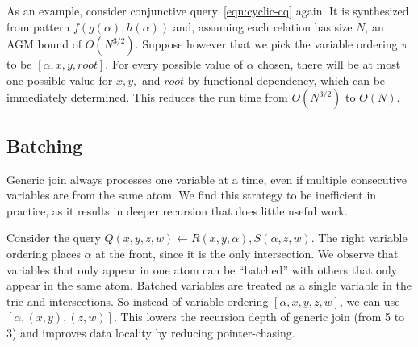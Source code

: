As an example, consider conjunctive query~\ref{eqn:cyclic-cq} again. It is
synthesized from pattern $f(g(\alpha), h(\alpha))$ and, assuming each relation
has size $N$, an AGM bound of $O(N^{3/2})$. Suppose however that we pick the
variable ordering $\pi$ to be $[\alpha, x, y, \textit{root}]$. For every
possible value of $\alpha$ chosen, there will be at most one possible value for
$x,y,$ and $\textit{root}$ by functional dependency, which can be immediately
determined. This reduces the run time from $O(N^{3/2})$ to $O(N)$.

\subsection{Batching}
Generic join always processes one variable at a time,
 even if multiple consecutive variables are from the same atom.
We find this strategy to be inefficient in practice,
 as it results in deeper recursion that does little useful work.

Consider the query $Q(x, y, z, w) \gets R(x, y, \alpha), S(\alpha, z, w)$.
The right variable ordering places $\alpha$ at the front,
 since it is the only intersection.
We observe that variables that only appear
 in one atom can be ``batched''
 with others that only appear in the same atom.
Batched variables are treated as a single variable
 in the trie and intersections.
So instead of variable ordering $[\alpha, x, y, z, w]$,
 we can use $[\alpha, (x, y), (z, w)]$.
This lowers the recursion depth of generic join (from 5 to 3)
 and improves data locality by reducing pointer-chasing.


